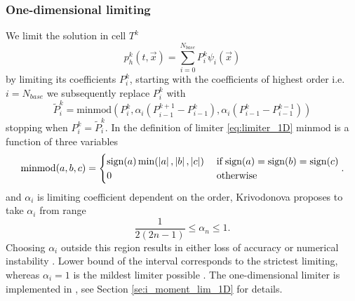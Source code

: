 \subsubsection{One-dimensional limiting}
\label{sse:moment_lim_1D}
We limit the solution in cell $T^k$
\begin{equation}
\label{eq:el_lin_comb_lim}
p_h^k(t, \vec{x}) = \sum\limits_{i=0}^{N_{base}} P_i^k\psi_i(\vec{x})
\end{equation}
by limiting its coefficients $P_i^k$, starting with the coefficients of 
highest order i.e. $i = N_{base}$ we subsequently replace 
$P_i^k$ with
\begin{equation}
\label{eq:limiter_1D}
    \tilde{P}_i^k = \text{minmod}\left(P_i^k, 
                        \alpha_i(P_{i-1}^{k+1} - P_{i-1}^k), 
                        \alpha_i (P_{i-1}^k - P_{i-1}^{k-1})\right)
\end{equation}
stopping when $P_i^k = \tilde{P}_i^k$. In the definition of limiter \eqref{eq:limiter_1D} 
$\text{minmod}$ is a function of three 
variables
\begin{equation}
    \text{minmod}(a,b,c) = 
    \begin{cases}
            \text{sign}(a)\min(\left\lvert a\right\rvert, \left\lvert b\right\rvert, \left\lvert c\right\rvert) & \;\text{if}\;     
                                                            \text{sign}(a) =
                                                            \text{sign}(b) = 
                                                            \text{sign}(c)\\
                                                        0 & \;\text{otherwise}
    \end{cases}.
\end{equation}
and $\alpha_i$ is limiting coefficient dependent on the order, Krivodonova 
\cite{Krivodonova2007} proposes to take $\alpha_i$ from range
\begin{equation}
    \frac{1}{2(2n -1)} \leq \alpha_n \leq 1.
\end{equation}
Choosing $\alpha_i$ outside this region results in either loss of accuracy or numerical 
instability \cite[p. 882]{Krivodonova2007}. Lower bound of the interval corresponds to 
the strictest limiting, whereas $\alpha_i = 1$ is the mildest limiter possible \cite[p. 
882]{Krivodonova2007}. The one-dimensional limiter is implemented in 
, see Section \ref{se:i_moment_lim_1D} for details.

